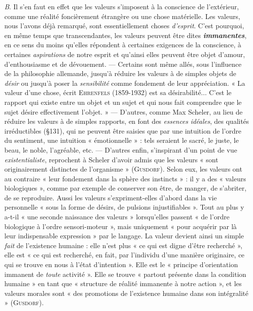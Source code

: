{\it B}. Il s’en faut en effet que les valeurs s'imposent à la conscience
de l'extérieur, comme une réalité foncièrement étrangère ou une chose
matérielle. Les valeurs, nous l'avons déjà remarqué, sont essentiellement
choses {\it d'esprit}. C’est pourquoi, en même temps que transcendantes,
les valeurs peuvent être dites \textbf{\textit {immanentes}}, en ce sens du
moins qu’elles répondent à certaines exigences de la conscience, à
certaines {\it aspirations} de notre esprit et qu’ainsi elles peuvent être
objet d'amour, d'enthousiasme et de dévouement. — Certains sont
même allés, sous l'influence de la philosophie allemande, jusqu’à
réduire les valeurs à de simples objets de {\it désir} ou jusqu’à poser la {\it sensibilité}
comme fondement de leur appréciation. « La valeur d’une chose,
écrit \textsc{Ehrenfels} (1859-1932) est sa désirabilité... C'est le rapport qui
existe entre un objet et un sujet et qui nous fait comprendre que
le sujet désire effectivement l’objet. » — D'autres, comme Max
Scheler, au lieu de réduire les valeurs à de simples rapports, en
font des {\it essences idéales}, des qualités irréductibles (\S 131), qui ne
peuvent être saisies que par une intuition de l’ordre du sentiment,
une intuition « émotionnelle » : tels seraient le sacré, le juste, le
beau, le noble, l’agréable, etc. — D’autres enfin, s'inspirant d'un
point de vue {\it existentialiste}, reprochent à Scheler d’avoir admis que
les valeurs « sont originairement distinctes de l'organisme » (\textsc{Gusdorf}).
Selon eux, les valeurs ont au contraire « leur fondement
dans la sphère des instincts » : il y a des « valeurs biologiques », comme
par exemple de conserver son être, de manger, de s’abriter, de se
reproduire. Aussi les valeurs s’expriment-elles d’abord dans la vie
personnelle « sous la forme de désirs, de pulsions injustifiables ».
Tout au plus y a-t-il « une seconde naissance des valeurs » lorsqu'elles
passent « de l’ordre biologique à l’ordre sensori-moteur », mais uniquement
« pour acquérir par là leur indispensable expression » par
le langage. La valeur devient ainsi un simple {\it fait} de l'existence
humaine : elle n’est plus « ce qui est digne d’être recherché », elle est
« ce qui est recherché, en fait, par l’individu d’une manière originaire,
ce qui se trouve en nous à l’état d'intention ». Elle est le « principe
d'orientation immanent de {\it toute} activité ». Elle se trouve « partout
présente dans la condition humaine » en tant que « structure de réalité
immanente à notre action », et les valeurs morales sont « des promotions
de l'existence humaine dans son intégralité » (\textsc{Gusdorf}).


